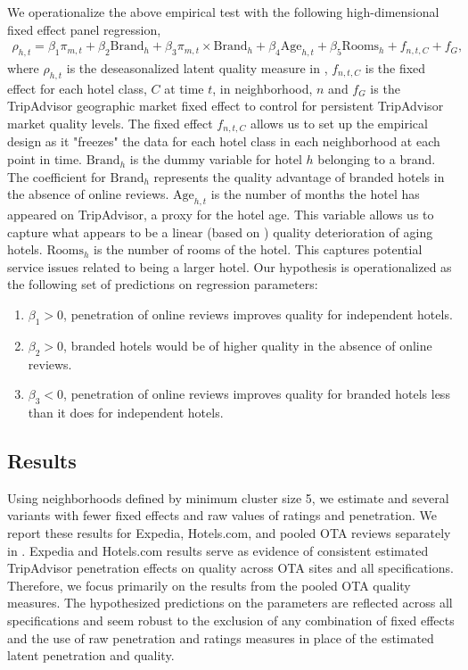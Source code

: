 \documentclass[mksc,blindrev]{informs3} %
\begin{document}
We operationalize the above empirical test with the following high-dimensional fixed effect panel regression,
\begin{equation}\label{eq:nbhd_brand}
\begin{split}
\rho_{h,t}=\beta_{1} \pi_{m,t} + \beta_{2} \text{Brand}_{h} + \beta_{3} \pi_{m,t}\times \text{Brand}_{h} + \beta_{4}\text{Age}_{h,t} + \beta_{5} \text{Rooms}_{h} + f_{n,t,C}+f_{G},
\end{split}
\end{equation}
where $\rho_{h,t}$ is the deseasonalized latent quality measure in , $f_{n,t,C}$ is the fixed effect for each hotel class, $C$ at time $t$, in neighborhood, $n$ and $f_{G}$ is the TripAdvisor geographic market fixed effect to control for persistent TripAdvisor market quality levels. The fixed effect $f_{n,t,C}$ allows us to set up the empirical design as it "freezes" the data for each hotel class in each neighborhood at each point in time. $\text{Brand}_h$ is the dummy variable for hotel $h$ belonging to a brand. The coefficient for $\text{Brand}_h$ represents the quality advantage of branded hotels in the absence of online reviews. $\text{Age}_{h,t}$ is the number of months the hotel has appeared on TripAdvisor, a proxy for the hotel age. This variable allows us to capture what appears to be a linear (based on ) quality deterioration of aging hotels.  $\text{Rooms}_{h}$ is the number of rooms of the hotel. This captures potential service issues related to being a larger hotel. Our hypothesis is operationalized as the following set of predictions on regression parameters:
\begin{enumerate}
\item $\beta_1>0$, penetration of online reviews improves quality for independent hotels.
\item $\beta_2>0$, branded hotels would be of higher quality in the absence of online reviews.
\item $\beta_3<0$, penetration of online reviews improves quality for branded hotels less than it does for independent hotels.
\end{enumerate}

\subsection{Results}

Using neighborhoods defined by minimum cluster size 5, we estimate  and several variants with fewer fixed effects and raw values of ratings and penetration. We report these results for Expedia, Hotels.com, and pooled OTA reviews separately in . Expedia and Hotels.com results serve as evidence of consistent estimated TripAdvisor penetration effects on quality across OTA sites and all specifications. Therefore, we focus primarily on the results from the pooled OTA quality measures. The hypothesized predictions on the parameters are reflected across all specifications and seem robust to the exclusion of any combination of fixed effects and the use of raw penetration and ratings measures in place of the estimated latent penetration and quality. 
\end{document}

